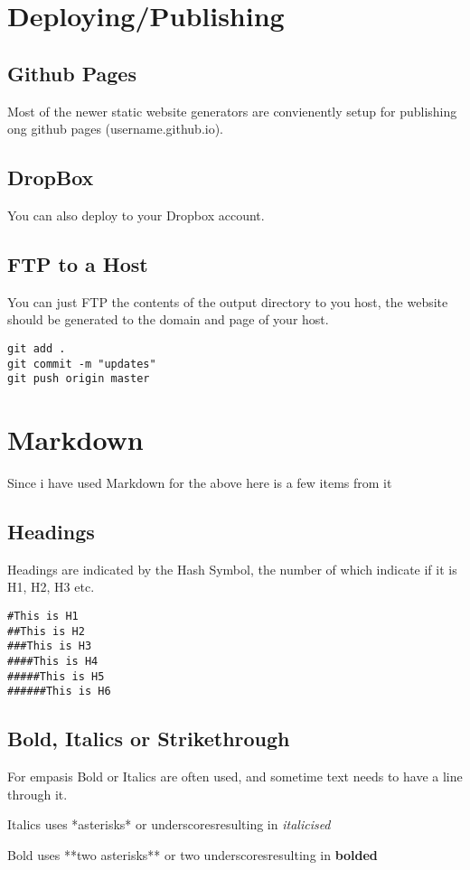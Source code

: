\documentclass[12pt]{article}			%
\begin{document}
\newpage
\section{Deploying/Publishing}
\subsection{Github Pages}
Most of the newer static website generators are convienently setup for publishing ong github pages (username.github.io).
\subsection{DropBox}
You can also deploy to your Dropbox account.
\subsection{FTP to a Host}
You can just FTP the contents of the output directory to you host, the website should be generated to the domain and page of your host.

\begin{verbatim}
git add .
git commit -m "updates"
git push origin master
\end{verbatim}



\newpage
\section{Markdown}
Since i have used Markdown for the above here is a few items from it

\subsection{Headings}
Headings are indicated by the Hash Symbol, the number of which indicate if it is H1, H2, H3 etc.
\begin{verbatim}
#This is H1
##This is H2
###This is H3
####This is H4
#####This is H5
######This is H6
\end{verbatim}
\subsection{Bold, Italics or Strikethrough}
For empasis Bold or Italics are often used, and sometime text needs to have a line through it.\par
Italics uses *asterisks* or \textunderscore underscores\textunderscore resulting in \textit{italicised} \par
Bold uses **two asterisks** or \textunderscore\textunderscore two underscores\textunderscore\textunderscore resulting in \textbf{bolded} \par
\end{document}
